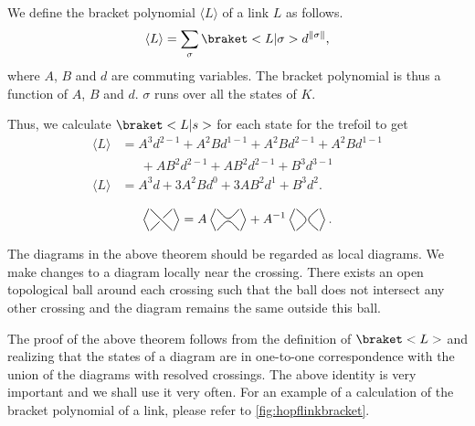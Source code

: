 We define the bracket polynomial \(\langle L\rangle\) of a link \(L\) as follows. \[\langle L \rangle = \sum_\sigma\braket<L|\sigma> d^{\norm{\sigma}},\] where \(A\), \(B\) and \(d\) are commuting variables. The bracket polynomial is thus a function of \(A\), \(B\) and \(d\). \(\sigma\) runs over all the states of \(K\).

Thus, we calculate \(\braket<L|s>\) for each state for the trefoil to get
\begin{align*}
    \langle L\rangle &= A^3d^{2-1} + A^2Bd^{1-1} + A^2Bd^{2-1} + A^2Bd^{1-1}\\
					 &\phantom{=\,} + AB^2d^{2-1} + AB^2d^{2-1} + B^3d^{3-1}\\
	\langle L\rangle &= A^3d + 3A^2Bd^0 + 3AB^2d^1 + B^3d^2.
\end{align*}

\begin{thm}
    \[\BB = A\BD + A^{-1}\BE.\]
\end{thm}

The diagrams in the above theorem should be regarded as local diagrams. We make changes to a diagram locally near the crossing. There exists an open topological ball around each crossing such that the ball does not intersect any other crossing and the diagram remains the same outside this ball.

The proof of the above theorem follows from the definition of \(\braket<L>\) and realizing that the states of a diagram are in one-to-one correspondence with the union of the diagrams with resolved crossings. The above identity is very important and we shall use it very often. For an example of a calculation of the bracket polynomial of a link, please refer to \cref{fig:hopflinkbracket}.

% 	

